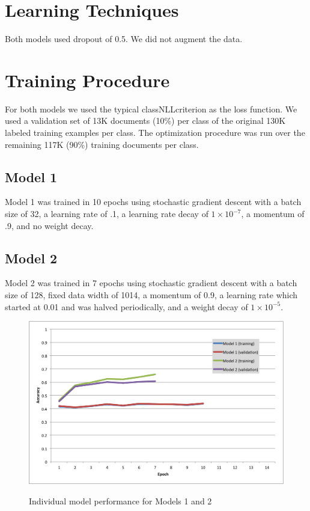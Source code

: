 \documentclass{article} %
\begin{document}
\section{Learning Techniques}

Both models used dropout of 0.5. We did not augment the data. 

\section{Training Procedure}

For both models we used the typical classNLLcriterion as the loss function. We used a validation set of 13K documents (10\%) per class of the original 130K labeled training examples per class.
The optimization procedure was run over the remaining 117K (90\%) training documents per class.


\subsection{Model 1}

Model 1 was trained in 10 epochs using stochastic gradient descent with a batch size of 32, a learning rate of .1, a learning rate decay of $1\times 10^{-7}$, a momentum of .9, and no weight decay.

\subsection{Model 2}

Model 2 was trained in 7 epochs using stochastic gradient descent with
a batch size of 128, fixed data width of 1014, a momentum of 0.9, a
learning rate which started at 0.01 and was halved periodically, and a
weight decay of $1\times 10^{-5}$.


\begin{figure}
	\includegraphics[width=\textwidth]{Training}
        \label{fig1}
        \caption{Individual model performance for Models 1 and 2}
\end{figure}
\end{document}
